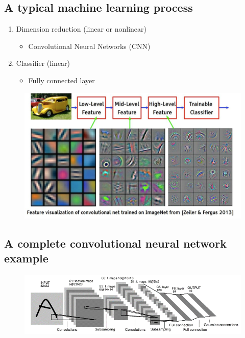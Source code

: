 \subsection{A typical machine learning process}
  \begin{enumerate}
  \item Dimension reduction (linear or nonlinear)
    \begin{itemize}
    \item Convolutional Neural Networks (CNN)
    \end{itemize}
\item Classifier (linear)
  \begin{itemize}
  \item Fully connected layer
  \end{itemize}
  \end{enumerate}
\begin{figure}[H]
\centering
		\includegraphics[width=.9\textwidth]{figures/CNNKernel}
\end{figure}




\subsection{A complete convolutional neural network example}

\begin{figure}[H]
\centering
\includegraphics[width=\linewidth]{figures/CNN2}
\end{figure}

